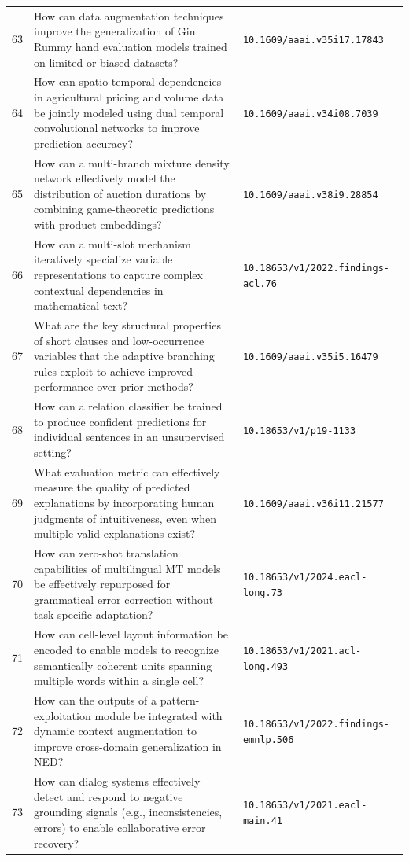 \documentclass[runningheads]{llncs}
\begin{document}
\begin{longtable}{@{}p{0.5cm}p{7.2cm}p{2.5cm}@{}}
63 & How can data augmentation techniques improve the generalization of Gin Rummy hand evaluation models trained on limited or biased datasets? & \texttt{10.1609/aaai.v35i17.17843} \\
64 & How can spatio-temporal dependencies in agricultural pricing and volume data be jointly modeled using dual temporal convolutional networks to improve prediction accuracy? & \texttt{10.1609/aaai.v34i08.7039} \\
65 & How can a multi-branch mixture density network effectively model the distribution of auction durations by combining game-theoretic predictions with product embeddings? & \texttt{10.1609/aaai.v38i9.28854} \\
66 & How can a multi-slot mechanism iteratively specialize variable representations to capture complex contextual dependencies in mathematical text? & \texttt{10.18653/v1/2022.findings-acl.76} \\
67 & What are the key structural properties of short clauses and low-occurrence variables that the adaptive branching rules exploit to achieve improved performance over prior methods? & \texttt{10.1609/aaai.v35i5.16479} \\
68 & How can a relation classifier be trained to produce confident predictions for individual sentences in an unsupervised setting? & \texttt{10.18653/v1/p19-1133} \\
69 & What evaluation metric can effectively measure the quality of predicted explanations by incorporating human judgments of intuitiveness, even when multiple valid explanations exist? & \texttt{10.1609/aaai.v36i11.21577} \\
70 & How can zero-shot translation capabilities of multilingual MT models be effectively repurposed for grammatical error correction without task-specific adaptation? & \texttt{10.18653/v1/2024.eacl-long.73} \\
71 & How can cell-level layout information be encoded to enable models to recognize semantically coherent units spanning multiple words within a single cell? & \texttt{10.18653/v1/2021.acl-long.493} \\
72 & How can the outputs of a pattern-exploitation module be integrated with dynamic context augmentation to improve cross-domain generalization in NED? & \texttt{10.18653/v1/2022.findings-emnlp.506} \\
73 & How can dialog systems effectively detect and respond to negative grounding signals (e.g., inconsistencies, errors) to enable collaborative error recovery? & \texttt{10.18653/v1/2021.eacl-main.41} \\

\end{longtable}
\end{document}
